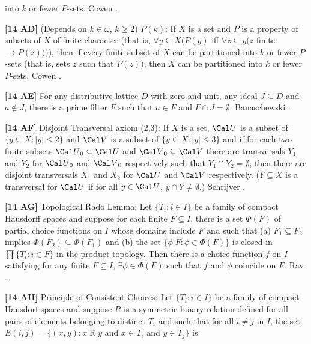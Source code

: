 into $k$ or fewer $P$-sets.  \ac{Cowen} \cite{1982}.
\smallskip
\item{}{\bf [14 AD]}  (Depends on $k\in\omega$, $k\ge 2$) $P(k)$:
If $X$ is a set and $P$ is a property of subsets of $X$ of finite character
(that is, $\forall y\subseteq X (P(y)$ iff $\forall z\subseteq y (z$
finite $\rightarrow  P(z)))$), then if every finite subset of $X$ can be
partitioned into $k$ or fewer $P$-sets (that is,
sets $z$ such that $P(z))$, then $X$ can be  partitioned into
$k$ or fewer $P$-sets.  \ac{Cowen} \cite{1982}.
\smallskip
\item{}{\bf [14 AE]}  For any distributive lattice $D$ with zero and unit,
any ideal $J \subseteq  D$ and $a \not\in  J$, there is a prime filter $F$
such that $a \in  F$ and $F \cap  J = \emptyset$.  \ac{Banaschewski}
\cite{1981}.
\smallskip
\item{}{\bf [14 AF]}  Disjoint Transversal axiom (2,3):  If $X$ is a  set,
${\Cal U}$ is a subset of $\{y\subseteq X : | y|\le 2\}$ and ${\Cal V}$
is a subset of $\{y\subseteq X: | y|\le 3\}$ and if for each two finite
subsets ${\Cal U}_{0}\subseteq{\Cal U}$ and ${\Cal V}_{0}\subseteq{\Cal V}$
there are transversals $Y_{1}$ and $Y_{2}$ for ${\Cal U}_{0}$  and
${\Cal V}_{0}$ respectively such that $Y_{1}\cap Y_{2}=\emptyset$, then
there are  disjoint transversals $X_{1}$ and $X_{2}$ for ${\Cal U}$ and
${\Cal V}$ respectively. ($Y\subseteq X$ is a transversal for ${\Cal U}$
if for all $y\in{\Cal U}$, $y\cap Y\neq\emptyset$.)  \ac{Schrijver}
\cite{1978}.
\smallskip
\item{}{\bf [14 AG]}  Topological Rado Lemma:  Let $\{T_i: i\in I\}$
be a family of compact Hausdorff spaces and suppose for each finite
$F\subseteq I$, there is a set $\Phi(F)$ of partial choice functions
on $I$ whose domains include $F$ and such that (a) $F_1\subseteq F_2$
implies $\Phi(F_2)\subseteq\Phi(F_{1})$ and (b) the set
$\{\phi\vert F: \phi\in\Phi(F)\}$ is closed in $\prod\{T_i: i\in F\}$ in
the product topology. Then there is a choice function $f$ on $I$
satisfying for any finite $F\subseteq I$, $\exists\phi\in\Phi(F)$ such
that $f$ and $\phi$ coincide on $F$.  \ac{Rav} \cite{1977}.
\smallskip
\item{}{\bf [14 AH]} Principle of Consistent Choices: Let $\{T_i:
i\in I\}$ be a family of compact Hausdorf spaces and suppose $R$ is a
symmetric binary relation defined for all pairs of elements belonging
to distinct $T_i$ and such that for all $i\neq j$ in $I$, the set
$E(i,j)=\{(x,y): x\mathrel R y$ and $x\in T_i$ and $y\in T_j\}$ is
